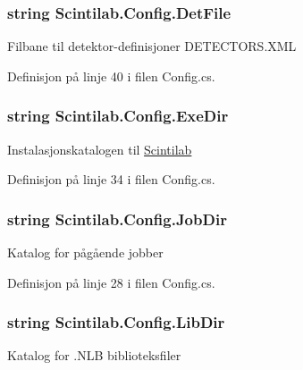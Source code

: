 \hypertarget{class_scintilab_1_1_config_aceb97f9538b41c0176f8408f81cc07ef}{
\subsubsection[{Det\+File}]{\setlength{\rightskip}{0pt plus 5cm}string Scintilab.\+Config.\+Det\+File\hspace{0.3cm}{\ttfamily [static]}}}\label{class_scintilab_1_1_config_aceb97f9538b41c0176f8408f81cc07ef}
Filbane til detektor-\/definisjoner D\+E\+T\+E\+C\+T\+O\+R\+S.\+X\+M\+L 

Definisjon på linje 40 i filen Config.\+cs.

\hypertarget{class_scintilab_1_1_config_a1df46889d2f1072cbfcd82e85117b55f}{
\subsubsection[{Exe\+Dir}]{\setlength{\rightskip}{0pt plus 5cm}string Scintilab.\+Config.\+Exe\+Dir\hspace{0.3cm}{\ttfamily [static]}}}\label{class_scintilab_1_1_config_a1df46889d2f1072cbfcd82e85117b55f}
Instalasjonskatalogen til \hyperlink{namespace_scintilab}{Scintilab} 

Definisjon på linje 34 i filen Config.\+cs.

\hypertarget{class_scintilab_1_1_config_a0810c3c214672429b456af8f77e98632}{
\subsubsection[{Job\+Dir}]{\setlength{\rightskip}{0pt plus 5cm}string Scintilab.\+Config.\+Job\+Dir\hspace{0.3cm}{\ttfamily [static]}}}\label{class_scintilab_1_1_config_a0810c3c214672429b456af8f77e98632}
Katalog for pågående jobber 

Definisjon på linje 28 i filen Config.\+cs.

\hypertarget{class_scintilab_1_1_config_a7254f3412dd5234d0691262a8b898fd7}{
\subsubsection[{Lib\+Dir}]{\setlength{\rightskip}{0pt plus 5cm}string Scintilab.\+Config.\+Lib\+Dir\hspace{0.3cm}{\ttfamily [static]}}}\label{class_scintilab_1_1_config_a7254f3412dd5234d0691262a8b898fd7}
Katalog for .N\+L\+B biblioteksfiler 

